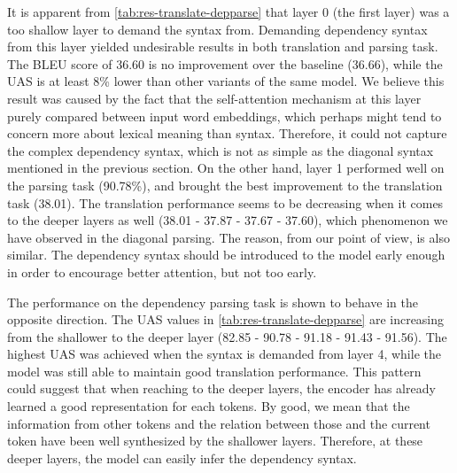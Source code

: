 It is apparent from \cref{tab:res-translate-depparse} that layer 0 (the first layer) was a too shallow layer to demand the syntax from.
Demanding dependency syntax from this layer yielded undesirable results in both translation and parsing task.
The BLEU score of 36.60 is no improvement over the baseline (36.66), while the UAS is at least 8\% lower than other variants of the same model.
We believe this result was caused by the fact that the self-attention mechanism at this layer purely compared between input word embeddings, which perhaps might tend to concern more about lexical meaning than syntax.
Therefore, it could not capture the complex dependency syntax, which is not as simple as the diagonal syntax mentioned in the previous section.
On the other hand, layer 1 performed well on the parsing task (90.78\%), and brought the best improvement to the translation task (38.01).
The translation performance seems to be decreasing when it comes to the deeper layers as well (38.01 - 37.87 - 37.67 - 37.60), which phenomenon we have observed in the diagonal parsing.
The reason, from our point of view, is also similar.
The dependency syntax should be introduced to the model early enough in order to encourage better attention, but not too early.

The performance on the dependency parsing task is shown to behave in the opposite direction.
The UAS values in \cref{tab:res-translate-depparse} are increasing from the shallower to the deeper layer (82.85 - 90.78 - 91.18 - 91.43 - 91.56).
The highest UAS was achieved when the syntax is demanded from layer 4, while the model was still able to maintain good translation performance.
This pattern could suggest that when reaching to the deeper layers, the encoder has already learned a good representation for each tokens.
By good, we mean that the information from other tokens and the relation between those and the current token have been well synthesized by the shallower layers.
Therefore, at these deeper layers, the model can easily infer the dependency syntax.

